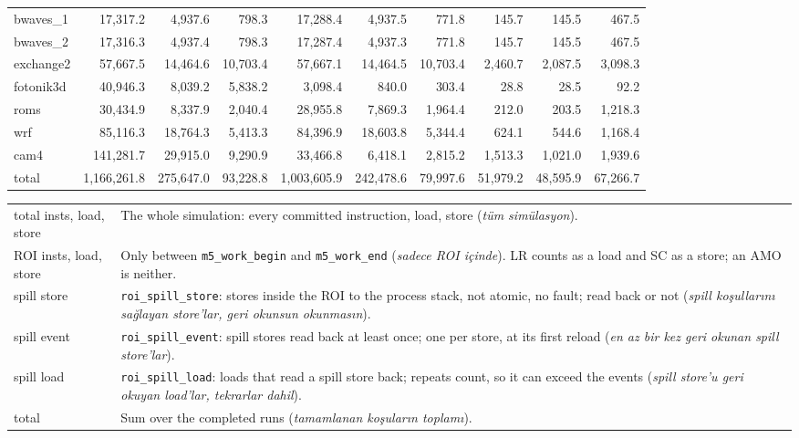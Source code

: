 \documentclass[10pt,a4paper]{article}
\newcommand{\ct}[1]{\texttt{#1}}
\renewcommand{\arraystretch}{1.2}
\begin{document}
{\begin{longtable}{@{}lrrrrrrrrr@{}}
bwaves\_1 & 17,317.2 & 4,937.6 & 798.3 & 17,288.4 & 4,937.5 & 771.8 & 145.7 & 145.5 & 467.5 \\
bwaves\_2 & 17,316.3 & 4,937.4 & 798.3 & 17,287.4 & 4,937.3 & 771.8 & 145.7 & 145.5 & 467.5 \\
exchange2 & 57,667.5 & 14,464.6 & 10,703.4 & 57,667.1 & 14,464.5 & 10,703.4 & 2,460.7 & 2,087.5 & 3,098.3 \\
fotonik3d & 40,946.3 & 8,039.2 & 5,838.2 & 3,098.4 & 840.0 & 303.4 & 28.8 & 28.5 & 92.2 \\
roms & 30,434.9 & 8,337.9 & 2,040.4 & 28,955.8 & 7,869.3 & 1,964.4 & 212.0 & 203.5 & 1,218.3 \\
wrf & 85,116.3 & 18,764.3 & 5,413.3 & 84,396.9 & 18,603.8 & 5,344.4 & 624.1 & 544.6 & 1,168.4 \\
cam4 & 141,281.7 & 29,915.0 & 9,290.9 & 33,466.8 & 6,418.1 & 2,815.2 & 1,513.3 & 1,021.0 & 1,939.6 \\
\midrule
total & 1,166,261.8 & 275,647.0 & 93,228.8 & 1,003,605.9 & 242,478.6 & 79,997.6 & 51,979.2 & 48,595.9 & 67,266.7 \\
\end{longtable}
}
{\footnotesize\renewcommand{\arraystretch}{1.0}
\begin{tabularx}{\textwidth}{@{}>{\raggedright\arraybackslash}p{27mm} >{\raggedright\arraybackslash}X@{}}
total insts, load, store & The whole simulation: every committed instruction, load, store (\textit{t\"um sim\"ulasyon}). \\
ROI insts, load, store & Only between \ct{m5\_work\_begin} and \ct{m5\_work\_end} (\textit{sadece ROI i\c{c}inde}). LR counts as a load and SC as a store; an AMO is neither. \\
spill store & \ct{roi\_spill\_store}: stores inside the ROI to the process stack, not atomic, no fault; read back or not (\textit{spill ko\c{s}ullar{\i}n{\i} sa\u{g}layan store'lar, geri okunsun okunmas{\i}n}). \\
spill event & \ct{roi\_spill\_event}: spill stores read back at least once; one per store, at its first reload (\textit{en az bir kez geri okunan spill store'lar}). \\
spill load & \ct{roi\_spill\_load}: loads that read a spill store back; repeats count, so it can exceed the events (\textit{spill store'u geri okuyan load'lar, tekrarlar dahil}). \\
total & Sum over the completed runs (\textit{tamamlanan ko\c{s}ular{\i}n toplam{\i}}). \\
\end{tabularx}\par}
\end{document}
